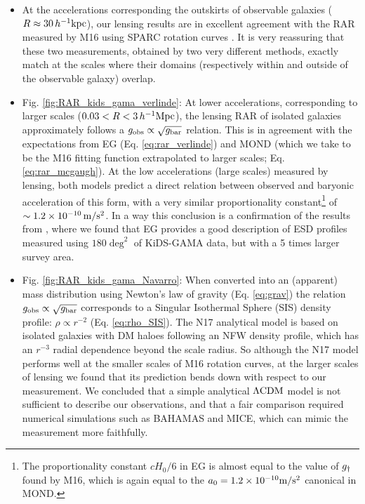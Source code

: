 \documentclass[usenatbib]{mnras}
\newcommand{\hkpc}{\, h^{-1}{\rm{kpc}} }
\newcommand{\hMpc}{\, h^{-1}{\rm{Mpc}} }
\newcommand{\mpss}{ {\rm m/s^2} }
\newcommand{\lcdm}{{\rm \Lambda CDM}}
\newcommand*{\E}[1]{\times 10^{#1}}
\newcommand{\un}[1]{_{\rm #1}}
\begin{document}
\begin{itemize}
	\item At the accelerations corresponding the outskirts of observable galaxies ($R \approx 30\hkpc$), our lensing results are in excellent agreement with the RAR measured by M16 using SPARC rotation curves \cite[]{lelli2016b}. It is very reassuring that these two measurements, obtained by two very different methods, exactly match at the scales where their domains (respectively within and outside of the observable galaxy) overlap.
	
	\item Fig. \ref{fig:RAR_kids_gama_verlinde}: At lower accelerations, corresponding to larger scales ($0.03 < R < 3 \hMpc$), the lensing RAR of isolated galaxies approximately follows a $g\un{obs} \propto \sqrt{g\un{bar}}$ relation. This is in agreement with the expectations from EG (Eq. \ref{eq:rar_verlinde}) and MOND (which we take to be the M16 fitting function extrapolated to larger scales; Eq. \ref{eq:rar_mcgaugh}). At the low accelerations (large scales) measured by lensing, both models predict a direct relation between observed and baryonic acceleration of this form, with a very similar proportionality constant\footnote{The proportionality constant $c H_0 / 6$ in EG is almost equal to the value of $g\un{\dagger}$ found by M16, which is again equal to the $a_0=1.2\E{-10} \mpss$ canonical in MOND.} of $\sim1.2\E{-10} \, \mpss$. In a way this conclusion is a confirmation of the results from \cite{brouwer2017}, where we found that EG provides a good description of ESD profiles measured using $180 \deg^2$ of KiDS-GAMA data, but with a 5 times larger survey area.
	
	\item Fig. \ref{fig:RAR_kids_gama_Navarro}: When converted into an (apparent) mass distribution using Newton's law of gravity (Eq. \ref{eq:grav}) the relation $g\un{obs} \propto \sqrt{g\un{bar}}$ corresponds to a Singular Isothermal Sphere (SIS) density profile: $\rho \propto r^{-2}$ (Eq. \ref{eq:rho_SIS}). The N17 analytical model is based on isolated galaxies with DM haloes following an NFW density profile, which has an $r^{-3}$ radial dependence beyond the scale radius. So although the N17 model performs well at the smaller scales of M16 rotation curves, at the larger scales of lensing we found that its prediction bends down with respect to our measurement. We concluded that a simple analytical $\lcdm$ model is not sufficient to describe our observations, and that a fair comparison required numerical simulations such as BAHAMAS and MICE, which can mimic the measurement more faithfully.
	

\end{itemize}
\end{document}
